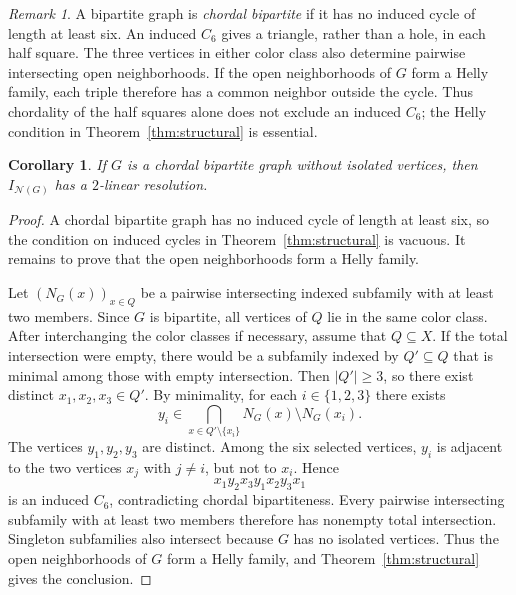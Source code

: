 \documentclass[11pt]{amsart}
\newtheorem{corollary}[theorem]{Corollary}
\theoremstyle{definition}
\theoremstyle{remark}
\newtheorem{remark}[theorem]{Remark}
\numberwithin{equation}{section}
\newcommand{\NN}{\mathcal N}
\begin{document}
	\begin{remark}
		A bipartite graph is \emph{chordal bipartite} if it has no induced cycle of
		length at least six. An induced \(C_6\) gives a triangle, rather than a
		hole, in each half square. The three vertices in either color class also
		determine pairwise intersecting open neighborhoods. If the open
		neighborhoods of \(G\) form a Helly family, each triple therefore
		has a common neighbor outside
		the cycle. Thus chordality of the half squares alone does not exclude an induced
		\(C_6\); the Helly condition in Theorem~\ref{thm:structural} is essential.
	\end{remark}
	
	\begin{corollary}\label{cor:chordal-bipartite}
		If \(G\) is a chordal bipartite graph without isolated vertices, then
		\(I_{\NN(G)}\) has a \(2\)-linear resolution.
	\end{corollary}
	
	\begin{proof}
		A chordal bipartite graph has no induced cycle of length at least six, so the
		condition on induced cycles in Theorem~\ref{thm:structural} is vacuous. It
		remains to prove that the open neighborhoods form a Helly family.
		
		Let \((N_G(x))_{x\in Q}\) be a pairwise intersecting indexed subfamily with at
		least two members. Since \(G\) is bipartite, all vertices of \(Q\) lie in the
		same color class. After interchanging the color classes if necessary, assume
		that \(Q\subseteq X\). If the total intersection were empty, there would be a subfamily indexed by
		\(Q'\subseteq Q\) that is minimal among those with empty intersection. Then
		\(|Q'|\ge3\), so there exist distinct \(x_1,x_2,x_3\in Q'\). By minimality, for each \(i\in\{1,2,3\}\) there
		exists
		\[
		y_i\in
		\bigcap_{x\in Q'\setminus\{x_i\}}N_G(x)
		\setminus N_G(x_i).
		\]
		The vertices \(y_1,y_2,y_3\) are distinct. Among the six selected vertices,
		\(y_i\) is adjacent to the two vertices \(x_j\) with \(j\ne i\), but not to
		\(x_i\). Hence
		\[
		x_1y_2x_3y_1x_2y_3x_1
		\]
		is an induced \(C_6\), contradicting chordal bipartiteness. Every pairwise
		intersecting subfamily with at least two members therefore has nonempty total
		intersection. Singleton subfamilies also intersect because \(G\) has no
		isolated vertices. Thus the open neighborhoods of \(G\) form a Helly family, and
		Theorem~\ref{thm:structural} gives the conclusion.
	\end{proof}
	
\end{document}
